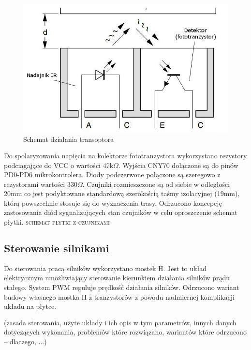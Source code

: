 \documentclass[11pt,a4paper]{article}
\begin{document}
\begin{figure}[H]
  \includegraphics[scale=0.6]{CNY70}
  \caption{Schemat działania transoptora}
\end{figure}

Do spolaryzowania napięcia na kolektorze fototranzystora wykorzystano rezystory podciągające do VCC o wartości 47k$\Omega$. 
Wyjścia CNY70 dołączone są do pinów PD0-PD6 mikrokontrolera.
Diody podczerwone połączone są szeregowo z rezystorami wartości 330$\Omega$.
Czujniki rozmieszczone są od siebie w odległości 20mm co jest podyktowane standardową szerokością taśmy izolacyjnej (19mm), którą powszechnie stosuje się do wyznaczenia trasy.
Odrzucono koncepcję zastosowania diód sygnalizujących stan czujników w celu oproszczenie schemat płytki.
\textsc{schemat płytki z czujnikami}

\subsection{Sterowanie silnikami} 
Do sterowania pracą silników wykorzystano mostek H. Jest to układ elektrycznym umożliwiający sterowanie kierunkiem działania silników prądu stałego. System PWM reguluje prędkość działania silników. Odrzucono wariant budowy własnego mostka H z tranzystorów z powodu nadmiernej komplikacji układu na płytce.

(zasada sterowania, użyte układy i ich opis w tym parametrów, innych danych dotyczących
wykonania, problemów które rozwiązano, wariantów które odrzucono – dlaczego, ...)
\end{document}
